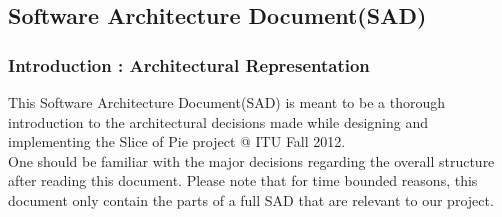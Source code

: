 \subsection{Software Architecture Document(SAD)}
\subsubsection{Introduction : Architectural Representation}
This Software Architecture Document(SAD) is meant to be a thorough introduction to the architectural decisions made while designing and implementing the Slice of Pie project @ ITU Fall 2012.\\
One should be familiar with the major decisions regarding the overall structure after reading this document. Please note that for time bounded reasons, this document only contain the parts of a full SAD that are relevant to our project. 